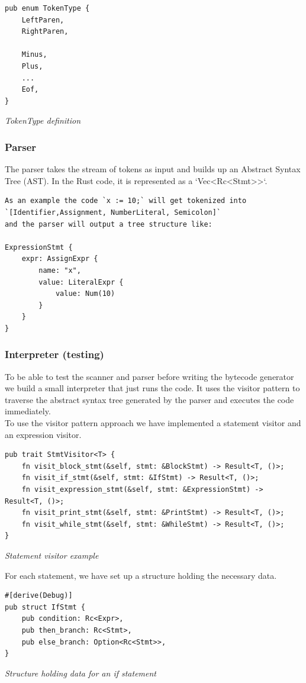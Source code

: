 \documentclass{article}
\begin{document}
\begin{verbatim}
pub enum TokenType {
    LeftParen,
    RightParen,

    Minus,
    Plus,
    ...
    Eof,
}
\end{verbatim}
\textit{TokenType definition}

\subsubsection{Parser}
The parser takes the stream of tokens as input and builds up an Abstract Syntax
Tree (AST). In the Rust code, it is represented as a `Vec<Rc<Stmt>>`.

\begin{verbatim}
As an example the code `x := 10;` will get tokenized into 
`[Identifier,Assignment, NumberLiteral, Semicolon]` 
and the parser will output a tree structure like:

ExpressionStmt {
    expr: AssignExpr {
        name: "x",
        value: LiteralExpr {
            value: Num(10)
        }
    }
}
\end{verbatim}

\subsubsection{Interpreter (testing)}
To be able to test the scanner and parser before writing the bytecode generator
we build a small interpreter that just runs the code.
It uses the visitor pattern to traverse the abstract syntax tree generated by
the parser and executes the code immediately.
\\
To use the visitor pattern approach we have implemented a statement visitor and
an expression visitor.

\begin{verbatim}
pub trait StmtVisitor<T> {
    fn visit_block_stmt(&self, stmt: &BlockStmt) -> Result<T, ()>;
    fn visit_if_stmt(&self, stmt: &IfStmt) -> Result<T, ()>;
    fn visit_expression_stmt(&self, stmt: &ExpressionStmt) -> Result<T, ()>;
    fn visit_print_stmt(&self, stmt: &PrintStmt) -> Result<T, ()>;
    fn visit_while_stmt(&self, stmt: &WhileStmt) -> Result<T, ()>;
}
\end{verbatim}
\textit{Statement visitor example}

For each statement, we have set up a structure holding the necessary data.

\begin{verbatim}
#[derive(Debug)]
pub struct IfStmt {
    pub condition: Rc<Expr>,
    pub then_branch: Rc<Stmt>,
    pub else_branch: Option<Rc<Stmt>>,
}
\end{verbatim}
\textit{Structure holding data for an if statement}
\end{document}
